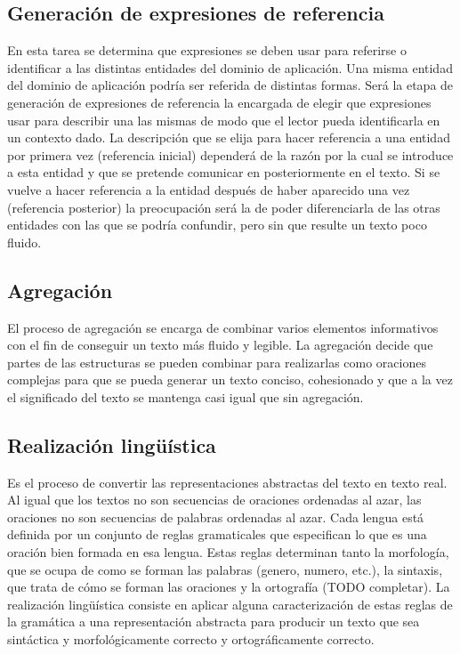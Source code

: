 \subsection{Generación de expresiones de referencia}
En esta tarea se determina que expresiones se deben usar para referirse o identificar a las distintas entidades del dominio de aplicación.
Una misma entidad del dominio de aplicación podría ser referida de distintas formas. Será la etapa de generación de expresiones de referencia la encargada de elegir que expresiones usar para describir una las mismas de modo que el lector pueda identificarla en un contexto dado. La descripción que se elija para hacer referencia a una entidad por primera vez (referencia inicial) dependerá de la razón por la cual se introduce a esta entidad y que se pretende comunicar en posteriormente en el texto. Si se vuelve a hacer referencia a la entidad después de haber aparecido una vez (referencia posterior) la preocupación será la de poder diferenciarla de las otras entidades con las que se podría confundir, pero sin que resulte un texto poco fluido.


\subsection{Agregación}
El proceso de agregación se encarga de combinar varios elementos informativos con el fin de conseguir un texto más fluido y legible. La agregación decide que partes de las estructuras se pueden combinar para realizarlas como oraciones complejas para que se pueda generar un texto conciso, cohesionado y que a la vez el significado del texto se mantenga casi igual que sin agregación. 


\subsection{Realización lingüística}
Es el proceso de convertir las representaciones abstractas del texto en texto real.
Al igual que los textos no son secuencias de oraciones ordenadas al azar, las oraciones no son secuencias de palabras ordenadas al azar. Cada lengua está definida por un conjunto de reglas gramaticales que especifican lo que es una oración bien formada en esa lengua. Estas reglas determinan tanto la morfología, que se ocupa de como se forman las palabras (genero, numero, etc.), la sintaxis, que trata de cómo se forman las oraciones y la ortografía (TODO completar). La realización lingüística consiste en aplicar alguna caracterización de estas reglas de la gramática a una representación abstracta para producir un texto que sea sintáctica y morfológicamente correcto y ortográficamente correcto.

